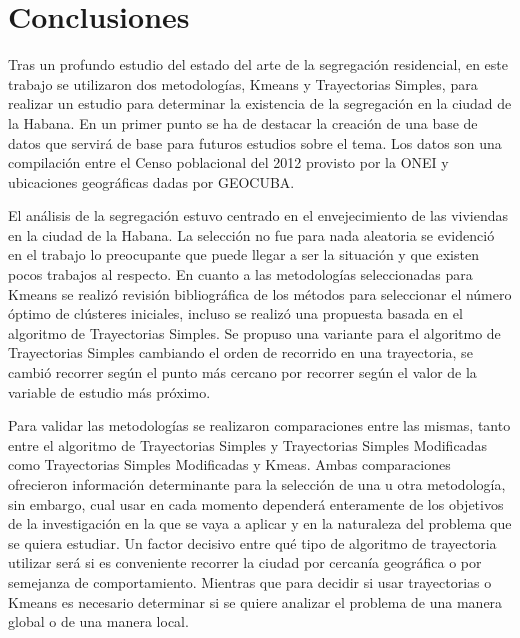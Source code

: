 \chapter*{Conclusiones}\label{chapter:conclusions}

  
Tras un profundo estudio del estado del arte de la segregación residencial, en este trabajo se utilizaron dos metodologías, Kmeans y Trayectorias Simples, para realizar un estudio para determinar la existencia de la segregación en la ciudad de la Habana. En un primer punto se ha de destacar la creación de una base de datos que servirá de base para futuros estudios sobre el tema. Los datos son una compilación entre el Censo poblacional del 2012 provisto por la ONEI y ubicaciones geográficas dadas por GEOCUBA.

El análisis de la segregación estuvo centrado en el envejecimiento de las viviendas en la ciudad de la Habana. La selección no fue para nada aleatoria se evidenció en el trabajo lo preocupante que puede llegar a ser la situación y que existen pocos trabajos al respecto. En cuanto a las metodologías seleccionadas para Kmeans se realizó revisión bibliográfica de los métodos para seleccionar el número óptimo de clústeres iniciales, incluso se realizó una propuesta basada en el algoritmo de Trayectorias Simples.  Se propuso una variante para el algoritmo de Trayectorias Simples cambiando el orden de recorrido en una trayectoria, se cambió recorrer según el punto más cercano por recorrer según el valor de la variable de estudio más próximo.
 
Para validar las metodologías se realizaron comparaciones entre las mismas, tanto entre el algoritmo de Trayectorias Simples y Trayectorias Simples Modificadas como Trayectorias Simples Modificadas y Kmeas. Ambas comparaciones ofrecieron información determinante para la selección de una u otra metodología, sin embargo, cual usar en cada momento dependerá enteramente de los objetivos de la investigación en la que se vaya a aplicar y en la naturaleza del problema que se quiera estudiar. Un factor decisivo entre qué tipo de algoritmo de trayectoria utilizar será si es conveniente recorrer la ciudad por cercanía geográfica o por semejanza de comportamiento. Mientras que para decidir si usar trayectorias o Kmeans es necesario determinar si se quiere analizar el problema de una manera global o de una manera local.

